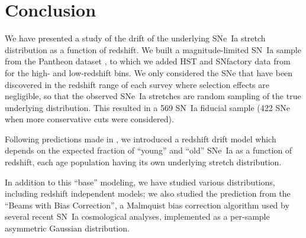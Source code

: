 \documentclass[]{aa} %
\begin{document}
\section{Conclusion}\label{sec:ccl}

We have presented a study of the drift of the underlying SNe~Ia stretch
distribution as a function of redshift. We built a magnitude-limited SN~Ia
sample from the Pantheon dataset \citep[][SDSS, PS1 and SNLS]{scolnic2018a}, to
which we added HST and SNfactory data from \cite{rigault2018} for the high- and
low-redshift bins. We only considered the SNe that have been discovered in the
redshift range of each survey where selection effects are negligible, so that
the observed SNe~Ia stretches are random sampling of the true underlying
distribution. This resulted in a 569 SN~Ia fiducial sample (422 SNe when more
conservative cuts were considered).

Following predictions made in \cite{rigault2018}, we introduced a redshift drift
model which depends on the expected fraction of ``young'' and ``old'' SNe~Ia as
a function of redshift, each age population having its own underlying
stretch distribution.

In addition to this ``base'' modeling, we have studied various distributions,
including redshift independent models; we also studied the prediction from the
``Beams with Bias Correction'', a Malmquist bias correction algorithm used by
several recent SN~Ia cosmological analyses, implemented as a per-sample
asymmetric Gaussian distribution.
\end{document}

